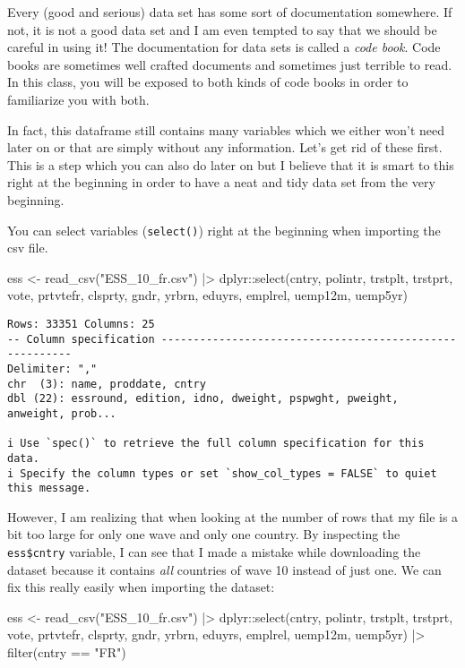\documentclass[
  letterpaper,
  DIV=11,
  numbers=noendperiod]{scrreprt}
\newenvironment{Shaded}{\begin{snugshade}}{\end{snugshade}}
\newcommand{\FunctionTok}[1]{\textcolor[rgb]{0.28,0.35,0.67}{#1}}
\newcommand{\NormalTok}[1]{\textcolor[rgb]{0.00,0.23,0.31}{#1}}
\newcommand{\OtherTok}[1]{\textcolor[rgb]{0.00,0.23,0.31}{#1}}
\newcommand{\SpecialCharTok}[1]{\textcolor[rgb]{0.37,0.37,0.37}{#1}}
\newcommand{\StringTok}[1]{\textcolor[rgb]{0.13,0.47,0.30}{#1}}
\begin{document}
Every (good and serious) data set has some sort of documentation
somewhere. If not, it is not a good data set and I am even tempted to
say that we should be careful in using it! The documentation for data
sets is called a \emph{code book}. Code books are sometimes well crafted
documents and sometimes just terrible to read. In this class, you will
be exposed to both kinds of code books in order to familiarize you with
both.

In fact, this dataframe still contains many variables which we either
won't need later on or that are simply without any information. Let's
get rid of these first. This is a step which you can also do later on
but I believe that it is smart to this right at the beginning in order
to have a neat and tidy data set from the very beginning.

You can select variables (\texttt{select()}) right at the beginning when
importing the csv file.

\begin{Shaded}
\begin{Highlighting}[]
\NormalTok{ess }\OtherTok{\textless{}{-}} \FunctionTok{read\_csv}\NormalTok{(}\StringTok{"ESS\_10\_fr.csv"}\NormalTok{)  }\SpecialCharTok{|\textgreater{}}  
\NormalTok{  dplyr}\SpecialCharTok{::}\FunctionTok{select}\NormalTok{(cntry, polintr, trstplt, trstprt, vote, prtvtefr, clsprty, gndr, yrbrn, eduyrs, emplrel, uemp12m, uemp5yr)}
\end{Highlighting}
\end{Shaded}

\begin{verbatim}
Rows: 33351 Columns: 25
-- Column specification --------------------------------------------------------
Delimiter: ","
chr  (3): name, proddate, cntry
dbl (22): essround, edition, idno, dweight, pspwght, pweight, anweight, prob...

i Use `spec()` to retrieve the full column specification for this data.
i Specify the column types or set `show_col_types = FALSE` to quiet this message.
\end{verbatim}

However, I am realizing that when looking at the number of rows that my
file is a bit too large for only one wave and only one country. By
inspecting the \texttt{ess\$cntry} variable, I can see that I made a
mistake while downloading the dataset because it contains \emph{all}
countries of wave 10 instead of just one. We can fix this really easily
when importing the dataset:

\begin{Shaded}
\begin{Highlighting}[]
\NormalTok{ess }\OtherTok{\textless{}{-}} \FunctionTok{read\_csv}\NormalTok{(}\StringTok{"ESS\_10\_fr.csv"}\NormalTok{) }\SpecialCharTok{|\textgreater{}} 
\NormalTok{  dplyr}\SpecialCharTok{::}\FunctionTok{select}\NormalTok{(cntry, polintr, trstplt, trstprt, vote, prtvtefr, clsprty, gndr, yrbrn, eduyrs, emplrel, uemp12m, uemp5yr) }\SpecialCharTok{|\textgreater{}} 
  \FunctionTok{filter}\NormalTok{(cntry }\SpecialCharTok{==} \StringTok{"FR"}\NormalTok{)}
\end{Highlighting}
\end{Shaded}
\end{document}
